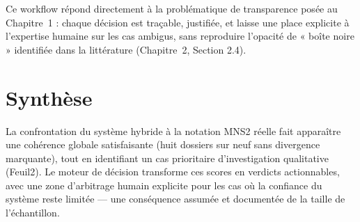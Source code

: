 Ce workflow répond directement à la problématique de transparence posée au Chapitre~1 : chaque
décision est traçable, justifiée, et laisse une place explicite à l'expertise humaine sur les cas
ambigus, sans reproduire l'opacité de « boîte noire » identifiée dans la littérature
(Chapitre~2, Section 2.4).

\section{Synthèse}

La confrontation du système hybride à la notation MNS2 réelle fait apparaître une cohérence
globale satisfaisante (huit dossiers sur neuf sans divergence marquante), tout en identifiant un
cas prioritaire d'investigation qualitative (Feuil2). Le moteur de décision transforme ces scores
en verdicts actionnables, avec une zone d'arbitrage humain explicite pour les cas où la confiance
du système reste limitée — une conséquence assumée et documentée de la taille de l'échantillon.
